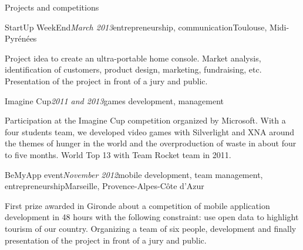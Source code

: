 \begin{rSection}{Projects and competitions}
  \begin{rSubsection}{StartUp WeekEnd}{\em March 2013}{entrepreneurship, communication}{Toulouse, Midi-Pyr\'{e}n\'{e}es}
    \item[] Project idea to create an ultra-portable home console. Market analysis, identification of customers, product design, marketing, fundraising, etc. Presentation of the project in front of a jury and public.
  \end{rSubsection}

  \begin{rSubsection}{Imagine Cup}{\em 2011 and 2013}{games development, management}{}
    \item[] Participation at the Imagine Cup competition organized by Microsoft. With a four students team, we developed video games with Silverlight and XNA around the themes of hunger in the world and the overproduction of waste in about four to five months. World Top 13 with Team Rocket team in 2011.
  \end{rSubsection}

  \begin{rSubsection}{BeMyApp event}{\em November 2012}{mobile development, team management, entrepreneurship}{Marseille, Provence-Alpes-C\^{o}te d'Azur}
    \item[] First prize awarded in Gironde about a competition of mobile application development in 48 hours with the following constraint: use open data to highlight tourism of our country. Organizing a team of six people, development and finally presentation of the project in front of a jury and public.
  \end{rSubsection}

\end{rSection}
